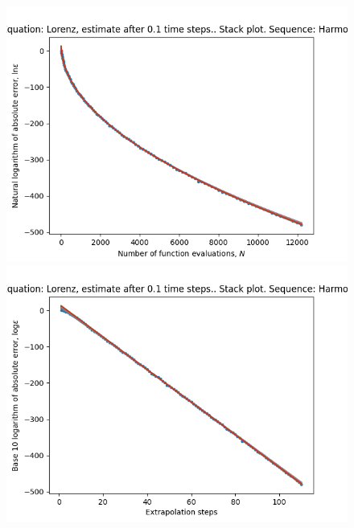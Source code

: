 \begin{figure}[H]
\centering
\begin{minipage}{0.45\textwidth}
\centering
\includegraphics[scale=0.45]{emr_plots/lorenz_hp_harmonic_stack.png}
\end{minipage}
\begin{minipage}{0.45\textwidth}
\centering
\includegraphics[scale=0.45]{emr_plots/lorenz_hp_harmonic_steps_stack.png}
\end{minipage}
\end{figure}

